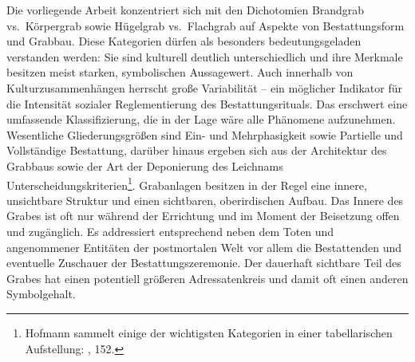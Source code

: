 \documentclass[openany,twoside,twocolumn]{book}
\let\rmarkdownfootnote\footnote%
\def\footnote{\protect\rmarkdownfootnote}
\begin{document}
Die vorliegende Arbeit konzentriert sich mit den Dichotomien Brandgrab
vs.~Körpergrab sowie Hügelgrab vs.~Flachgrab auf Aspekte von
Bestattungsform und Grabbau. Diese Kategorien dürfen als besonders
bedeutungsgeladen verstanden werden: Sie sind kulturell deutlich
unterschiedlich und ihre Merkmale besitzen meist starken, symbolischen
Aussagewert. Auch innerhalb von Kulturzusammenhängen herrscht große
Variabilität -- ein möglicher Indikator für die Intensität sozialer
Reglementierung des Bestattungsrituals. Das erschwert eine umfassende
Klassifizierung, die in der Lage wäre alle Phänomene aufzunehmen.
Wesentliche Gliederungsgrößen sind Ein- und Mehrphasigkeit sowie
Partielle und Vollständige Bestattung, darüber hinaus ergeben sich aus
der Architektur des Grabbaus sowie der Art der Deponierung des Leichnams
Unterscheidungskriterien\footnote{Hofmann sammelt einige der wichtigsten
  Kategorien in einer tabellarischen Aufstellung:
  \textcite{hofmann_rituelle_2008}, 152.}. Grabanlagen besitzen in der
Regel eine innere, unsichtbare Struktur und einen sichtbaren,
oberirdischen Aufbau. Das Innere des Grabes ist oft nur während der
Errichtung und im Moment der Beisetzung offen und zugänglich. Es
addressiert entsprechend neben dem Toten und angenommener Entitäten der
postmortalen Welt vor allem die Bestattenden und eventuelle Zuschauer
der Bestattungszeremonie. Der dauerhaft sichtbare Teil des Grabes hat
einen potentiell größeren Adressatenkreis und damit oft einen anderen
Symbolgehalt.
\end{document}
